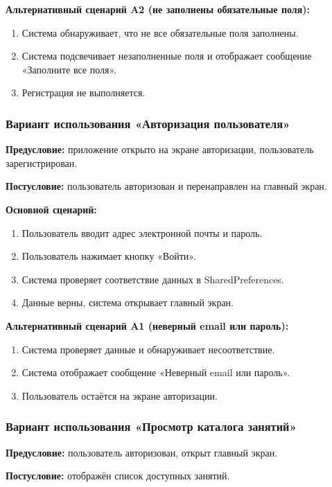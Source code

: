 \textbf{Альтернативный сценарий A2 (не заполнены обязательные поля):}
\begin{enumerate}
	\item Система обнаруживает, что не все обязательные поля заполнены.
	\item Система подсвечивает незаполненные поля и отображает сообщение «Заполните все поля».
	\item Регистрация не выполняется.
\end{enumerate}

\subsubsection{Вариант использования «Авторизация пользователя»}

\textbf{Предусловие:} приложение открыто на экране авторизации, пользователь зарегистрирован.

\textbf{Постусловие:} пользователь авторизован и перенаправлен на главный экран.

\textbf{Основной сценарий:}
\begin{enumerate}
	\item Пользователь вводит адрес электронной почты и пароль.
	\item Пользователь нажимает кнопку «Войти».
	\item Система проверяет соответствие данных в SharedPreferences.
	\item Данные верны, система открывает главный экран.
\end{enumerate}

\textbf{Альтернативный сценарий A1 (неверный email или пароль):}
\begin{enumerate}
	\item Система проверяет данные и обнаруживает несоответствие.
	\item Система отображает сообщение «Неверный email или пароль».
	\item Пользователь остаётся на экране авторизации.
\end{enumerate}

\subsubsection{Вариант использования «Просмотр каталога занятий»}

\textbf{Предусловие:} пользователь авторизован, открыт главный экран.

\textbf{Постусловие:} отображён список доступных занятий.

